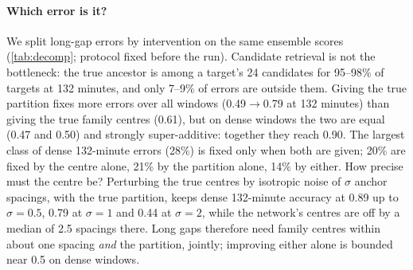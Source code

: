 \documentclass[10pt,twocolumn,letterpaper]{article}
\begin{document}
\paragraph{Which error is it?}
We split long-gap errors by intervention on the same ensemble scores (\cref{tab:decomp}; protocol fixed before the run). Candidate retrieval is not the bottleneck: the true ancestor is among a target's 24 candidates for 95--98\% of targets at 132 minutes, and only 7--9\% of errors are outside them. Giving the true partition fixes more errors over all windows (0.49$\to$0.79 at 132 minutes) than giving the true family centres (0.61), but on dense windows the two are equal (0.47 and 0.50) and strongly super-additive: together they reach 0.90. The largest class of dense 132-minute errors (28\%) is fixed only when both are given; 20\% are fixed by the centre alone, 21\% by the partition alone, 14\% by either. How precise must the centre be? Perturbing the true centres by isotropic noise of $\sigma$ anchor spacings, with the true partition, keeps dense 132-minute accuracy at 0.89 up to $\sigma{=}0.5$, 0.79 at $\sigma{=}1$ and 0.44 at $\sigma{=}2$, while the network's centres are off by a median of 2.5 spacings there. Long gaps therefore need family centres within about one spacing \emph{and} the partition, jointly; improving either alone is bounded near 0.5 on dense windows.

\end{document}
